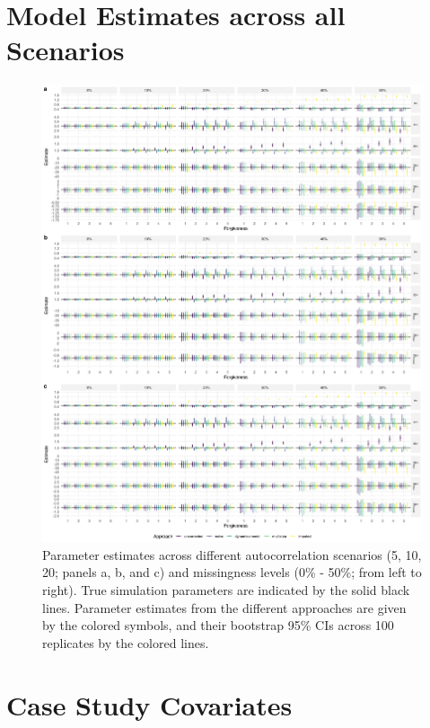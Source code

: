 \documentclass[abstract=on,10pt,a4paper,bibliography=totocnumbered]{article}
\begin{document}
\section{Model Estimates across all Scenarios}
\begin{figure}[!ht]
  \begin{center}
  \includegraphics[width = \textwidth]{99_ModelComparisonAppendix.png}
  \caption{Parameter estimates across different autocorrelation scenarios (5,
  10, 20; panels a, b, and c) and missingness levels (0\% - 50\%; from left
  to right). True simulation parameters are indicated by the solid black
  lines. Parameter estimates from the different approaches are given by the
  colored symbols, and their bootstrap 95\% CIs across 100 replicates
  by the colored lines.}
  \label{ModelComparison}
  \end{center}
\end{figure}

\newpage
\section{Case Study Covariates}
\end{document}
